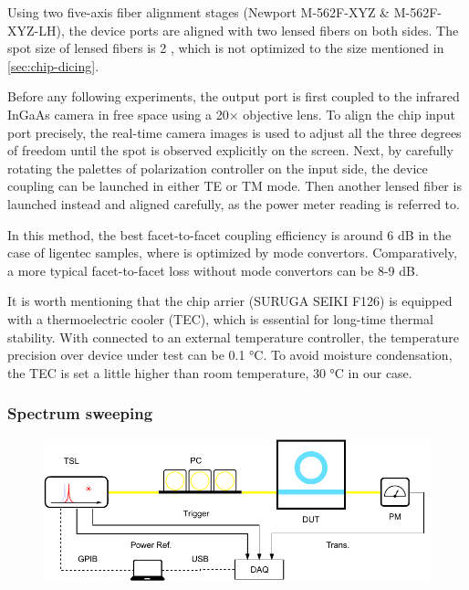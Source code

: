 Using two five-axis fiber alignment stages (Newport M-562F-XYZ \& M-562F-XYZ-LH), the device ports are aligned with two lensed fibers on both sides. The spot size of lensed fibers is 2 \um, which is not optimized to the size mentioned in \autoref{sec:chip-dicing}. 

Before any following experiments, the output port is first coupled to the infrared InGaAs camera in free space using a 20$\times$ objective lens. To align the chip input port precisely, the real-time camera images is used to adjust all the three degrees of freedom until the spot is observed explicitly on the screen. Next, by carefully rotating the palettes of polarization controller on the input side, the device coupling can be launched in either TE or TM mode. Then another lensed fiber is launched instead and aligned carefully, as the power meter reading is referred to.

In this method, the best facet-to-facet coupling efficiency is around 6 dB in the case of ligentec samples, where is optimized by mode convertors. Comparatively, a more typical facet-to-facet loss without mode convertors can be 8-9 dB.

It is worth mentioning that the chip arrier (SURUGA SEIKI F126) is equipped with a thermoelectric cooler (TEC), which is essential for long-time thermal stability. 
With connected to an external temperature controller, the temperature precision over device under test can be 0.1 \si{\celsius}.
To avoid moisture condensation, the TEC is set a little higher than room temperature, 30 \si{\celsius} in our case. 

\subsubsection{Spectrum sweeping}

\begin{figure}
	\centering
	\includegraphics[width=1\textwidth]{imgs/trans.pdf}
	\label{fig:transsetup}
\end{figure}


